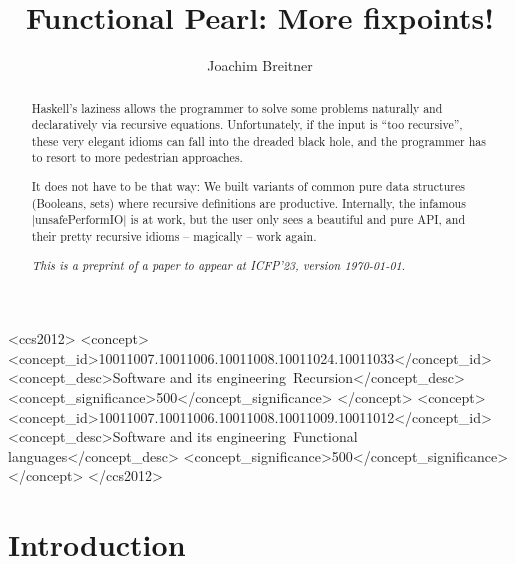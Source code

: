 \documentclass[manuscript,screen,acmsmall,nonacm]{acmart}
\begin{document}
\title{Functional Pearl: More fixpoints!}

\author{Joachim Breitner}


\begin{abstract}
Haskell’s laziness allows the programmer to solve some problems naturally and declaratively via recursive equations. Unfortunately, if the input is “too recursive”, these very elegant idioms can fall into the dreaded black hole, and the programmer has to resort to more pedestrian approaches.

It does not have to be that way: We built variants of common pure data structures (Booleans, sets) where recursive definitions are productive. Internally, the infamous |unsafePerformIO| is at work, but the user only sees a beautiful and pure API, and their pretty recursive idioms -- magically -- work again.

\emph{This is a preprint of a paper to appear at ICFP'23, version \today.}
\end{abstract}

\begin{CCSXML}
<ccs2012>
   <concept>
       <concept_id>10011007.10011006.10011008.10011024.10011033</concept_id>
       <concept_desc>Software and its engineering~Recursion</concept_desc>
       <concept_significance>500</concept_significance>
       </concept>
   <concept>
       <concept_id>10011007.10011006.10011008.10011009.10011012</concept_id>
       <concept_desc>Software and its engineering~Functional languages</concept_desc>
       <concept_significance>500</concept_significance>
       </concept>
 </ccs2012>
\end{CCSXML}



\maketitle

\section{Introduction}
\end{document}
